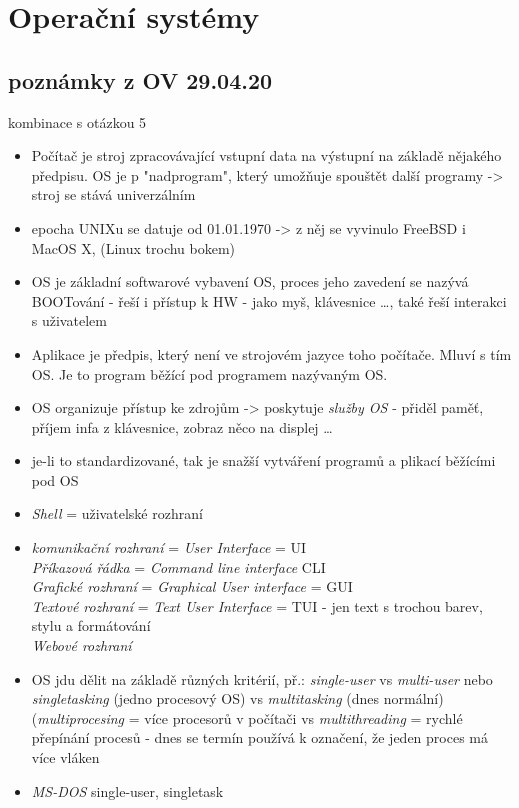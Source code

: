 \documentclass[12pt]{article}
\begin{document}
\section{Operační systémy}
\subsection{poznámky z OV 29.04.20}
\label{sec:OV_OS}
kombinace s otázkou 5
\begin{itemize}
\item Počítač je stroj zpracovávající vstupní data na výstupní na základě nějakého předpisu. OS je p "nadprogram", který umožňuje spouštět další programy -> stroj se stává univerzálním
\item epocha UNIXu se datuje od 01.01.1970 -> z něj se vyvinulo FreeBSD i MacOS X, (Linux trochu bokem)
\item OS je základní softwarové vybavení OS, proces jeho zavedení se nazývá BOOTování
 - řeší i přístup k HW - jako myš, klávesnice \dots , také řeší interakci s uživatelem
\item Aplikace je předpis, který není ve strojovém jazyce toho počítače. Mluví s tím OS. Je to program běžící pod programem nazývaným OS.
\item OS organizuje přístup ke zdrojům -> poskytuje \emph{služby OS} - přiděl paměť, příjem infa z klávesnice, zobraz něco na displej \dots
\item je-li to standardizované, tak je snažší vytváření programů a plikací běžícími pod OS
\item \emph{Shell} = uživatelské rozhraní
\item \emph{komunikační rozhraní } = \emph{User Interface} = UI \\
\emph{Příkazová řádka} = \emph{Command line interface} CLI\\
\emph{Grafické rozhraní} = \emph{Graphical User interface}  = GUI\\
\emph{Textové rozhraní} = \emph{Text User Interface} = TUI - jen text s trochou barev, stylu a formátování\\
\emph{Webové rozhraní}
\item OS jdu dělit na základě různých kritérií, př.: \emph{single-user} vs \emph{multi-user} nebo \emph{singletasking} (jedno procesový OS) vs \emph{multitasking} (dnes normální) (\emph{multiprocesing} = více procesorů v počítači vs \emph{multithreading} = rychlé přepínání procesů - dnes se termín používá k označení, že jeden proces má více vláken
\item \emph{MS-DOS} single-user, singletask

\end{itemize}
\end{document}
